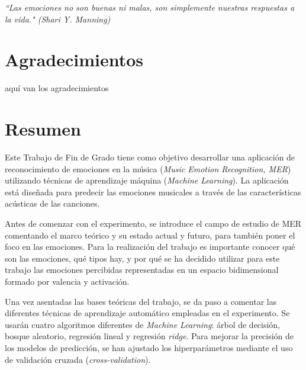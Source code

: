 \documentclass[12pt,a4paper]{article}
\begin{document}
\newpage
\thispagestyle{empty} %
\begin{flushright}
	\vspace*{5cm}
 	\textit{“Las emociones no son buenas ni malas, son simplemente nuestras respuestas a la vida." (Shari Y. Manning)}
\end{flushright}





\newpage
\thispagestyle{plain}
\section*{Agradecimientos}
 

aquí van los agradecimientos









\newpage
\section*{Resumen}
Este Trabajo de Fin de Grado tiene como objetivo desarrollar una aplicación de reconocimiento de emociones en la música (\textit{Music Emotion Recognition, MER}) utilizando técnicas de aprendizaje máquina (\textit{Machine Learning}). La aplicación está diseñada para predecir las emociones musicales a través de las características acústicas de las canciones.


Antes de comenzar con el experimento, se introduce el campo de estudio de MER comentando el marco teórico y su estado actual y futuro, para también poner el foco en las emociones. Para la realización del trabajo es importante conocer qué son las emociones, qué tipos hay, y por qué se ha decidido utilizar para este trabajo las emociones percibidas representadas en un espacio bidimensional formado por valencia y activación.


Una vez asentadas las bases teóricas del trabajo, se da paso a comentar las diferentes técnicas de aprendizaje automático empleadas en el experimento. Se usarán cuatro algoritmos diferentes de \textit{Machine Learning}: árbol de decisión, bosque aleatorio, regresión lineal y regresión \textit{ridge}. Para mejorar la precisión de los modelos de predicción, se han ajustado los hiperparámetros mediante el uso de validación cruzada (\textit{cross-validation}). 
\end{document}
